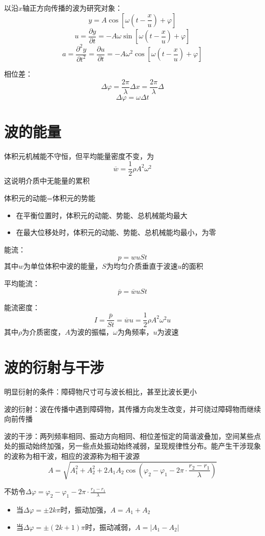 \documentclass[12pt, a4paper, twoside]{ctexbook}
\begin{document}
{\sonti 以沿$x$轴正方向传播的波为研究对象}：
$$
y=A\cos\left[\omega\left(t-\frac{x}{u}\right)+\varphi\right]
$$
$$
u=\frac{\partial y}{\partial t}=-A\omega\sin\left[\omega\left(t-\frac{x}{u}\right)+\varphi\right]
$$
$$
a=\frac{\partial^2 y}{\partial t^2}=\frac{\partial u}{\partial t}=-A\omega^2\cos\left[\omega\left(t-\frac{x}{u}\right)+\varphi\right]
$$

{\sonti 相位差}：
$$
\Delta\varphi=\frac{2\pi}{\lambda}\Delta x=\frac{2\pi}{\lambda}\Delta
$$
$$
\Delta\varphi=\omega\Delta t
$$
\section{波的能量}
体积元机械能不守恒，但平均能量密度不变，为
$$
\overline{w}=\frac{1}{2}\rho A^2 \omega^2
$$
这说明介质中无能量的累积

体积元的动能=体积元的势能

\begin{itemize}
    \item 在平衡位置时，体积元的动能、势能、总机械能均最大
    \item 在最大位移处时，体积元的动能、势能、总机械能均最小，为零
\end{itemize}

{\sonti 能流}：
$$
p=wuSt
$$
其中$w$为单位体积中波的能量，$S$为均匀介质垂直于波速$u$的面积

{\sonti 平均能流}：
$$
\overline{p}=\overline{w}uSt
$$

{\sonti 能流密度}：
$$
I=\frac{\overline{p}}{St}=\overline{w}u=\frac{1}{2}\rho A^2 \omega^2 u
$$
其中$\rho$为介质密度，$A$为波的振幅，$\omega$为角频率，$u$为波速

\section{波的衍射与干涉}
{\sonti 明显衍射的条件}：障碍物尺寸可与波长相比，甚至比波长更小

{\sonti 波的衍射}：波在传播中遇到障碍物，其传播方向发生改变，并可绕过障碍物而继续向前传播

{\sonti 波的干涉}：两列频率相同、振动方向相同、相位差恒定的简谐波叠加，空间某些点处的振动始终加强，另一些点处振动始终减弱，呈现规律性分布。能产生干涉现象的波称为相干波，相应的波源称为相干波源
$$
A=\sqrt{A_1^2+A_2^2+2A_1A_2\cos\left(\varphi_2-\varphi_1-2\pi\cdot\frac{r_2-r_1}{\lambda}\right)}
$$

不妨令$\Delta\varphi=\varphi_2-\varphi_1-2\pi\cdot\frac{r_2-r_1}{\lambda}$
\begin{itemize}
    \item 当$\Delta\varphi=\pm2k\pi$时，振动加强，$A=A_1+A_2$
    \item 当$\Delta\varphi=\pm\left(2k+1\right)\pi$时，振动减弱，$A=\left|A_1-A_2\right|$
\end{itemize}
\end{document}
